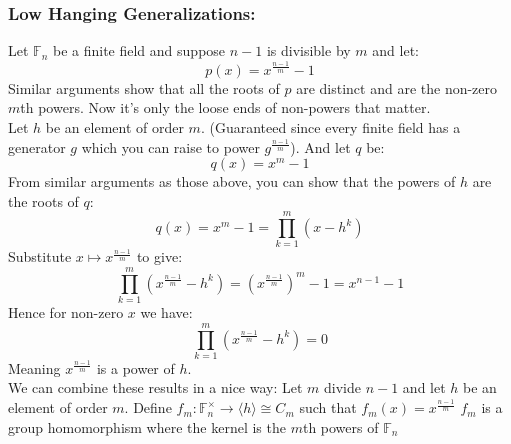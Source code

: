 \subsubsection{Low Hanging Generalizations:}
Let $\mathbb{F}_n$ be a finite field and suppose $n-1$ is divisible by $m$ and let:
\[p(x) = x^\frac{n-1}{m}-1\]
Similar arguments show that all the roots of $p$ are distinct and are the non-zero $m$th powers.
Now it's only the loose ends of non-powers that matter.
\\

Let $h$ be an element of order $m$.
(Guaranteed since every finite field has a generator $g$ which you can raise to power $g^\frac{n-1}{m}$).
And let $q$ be:
\[q(x)=x^m-1\]
From similar arguments as those above,
you can show that the powers of $h$ are the roots of $q$:
\[q(x) = x^m-1= \prod_{k=1}^m(x-h^k)\]
Substitute $x\mapsto x^\frac{n-1}{m}$ to give:
\[\prod_{k=1}^m(x^\frac{n-1}{m}-h^k)= (x^\frac{n-1}{m})^m-1=x^{n-1}-1\]
Hence for non-zero $x$ we have:
\[\prod_{k=1}^m(x^\frac{n-1}{m}-h^k)= 0\]
Meaning $x^\frac{n-1}{m}$ is a power of $h$.
\\

We can combine these results in a nice way:
Let $m$ divide $n-1$ and let $h$ be an element of order $m$.
Define $f_m:\mathbb{F}_n^\times\rightarrow \langle h\rangle \cong C_m$ such that $f_m(x) = x^{\frac{n-1}{m}}$
$f_m$ is a group homomorphism where the kernel is the $m$th powers of $\mathbb{F}_n$

%

